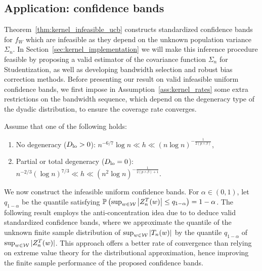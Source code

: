 \subsection{Application: confidence bands}

Theorem~\ref{thm:kernel_infeasible_ucb} constructs standardized confidence
bands for
$f_W$ which are infeasible as they depend on the unknown population variance
$\Sigma_n$. In Section~\ref{sec:kernel_implementation} we will make this
inference
procedure feasible by proposing a valid estimator of the covariance function
$\Sigma_n$ for Studentization, as well as developing bandwidth selection and
robust bias correction methods. Before presenting our result on valid
infeasible uniform confidence bands, we first impose in
Assumption~\ref{ass:kernel_rates} some extra restrictions on the bandwidth
sequence,
which depend on the degeneracy type of the dyadic distribution, to ensure the
coverage rate converges.

\begin{assumption}
  \label{ass:kernel_rates}
  Assume that one of the following holds:
  \begin{enumerate}[label=(\roman*)]

    \item
      \label{it:kernel_rate_non}
      No degeneracy ($D_{\textup{lo}} > 0$):
      $n^{-6/7} \log n \ll h \ll (n \log n)^{-\frac{1}{2(p \wedge \beta)}}$,

    \item
      \label{it:kernel_rate_degen}
      Partial or total degeneracy ($D_{\textup{lo}} = 0$):
      $n^{-2/3} (\log n)^{7/3} \ll h
      \ll (n^2 \log n)^{-\frac{1}{2(p \wedge \beta) + 1}}$.
  \end{enumerate}
\end{assumption}

We now construct the infeasible uniform confidence bands.
For $\alpha \in (0,1)$, let $q_{1-\alpha}$ be the quantile satisfying
$ \mathbb{P}\left(\sup_{w \in \mathcal{W}} \left| Z_n^T(w) \right| \leq q_{1-\alpha} \right)
= 1 - \alpha$.
The following result employs the anti-concentration idea due to
\citet{chernozhukov2014anti} to deduce valid standardized confidence bands,
where we approximate the quantile of the unknown finite sample distribution of
$\sup_{w\in\mathcal{W}} |T_n(w)|$ by the quantile $q_{1-\alpha}$ of
$\sup_{w\in\mathcal{W}}|Z_n^T(w)|$. This approach offers a better rate of convergence
than relying on extreme value theory for the distributional approximation,
hence improving the finite sample performance of the proposed confidence bands.

